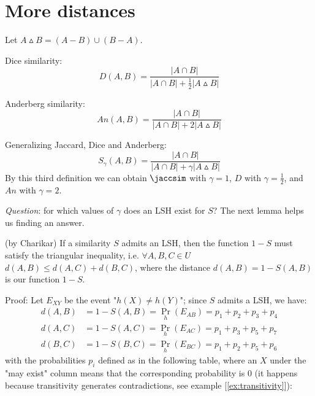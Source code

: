 
\section{More distances}
	Let $A \vartriangle B = (A-B) \cup (B-A)$.

	Dice similarity:
	\begin{equation}
	\displaystyle D(A, B) = \frac{|A\cap B|}{|A\cap B| + \frac{1}{2}|A\vartriangle B|}
	\end{equation}
	
	Anderberg similarity:
	\begin{equation}
	\displaystyle An(A, B) = \frac{|A\cap B|}{|A\cap B| + 2|A\vartriangle B|}
	\end{equation}
	
	Generalizing Jaccard, Dice and Anderberg: 
	\begin{equation}
	\displaystyle S_\gamma(A, B) = \frac{|A\cap B|}{|A\cap B| + \gamma|A\vartriangle B|}
	\end{equation}
	By this third definition we can obtain $\jaccsim$ with $\gamma=1$, $D$ with $\gamma=\frac{1}{2}$, and $An$ with $\gamma=2$.
	
	\textit{Question}: for which values of $\gamma$ does an LSH exist for $S$? The next lemma helps us finding an answer.
	
	\lem (by Charikar) If a similarity $S$ admits an LSH, then the function $1-S$ must satisfy the triangular inequality, i.e. $\forall A,B,C \in U$ \\ $d(A,B) \leq d(A,C) + d(B,C)$, where the distance $d(A,B) = 1-S(A,B)$ is our function $1-S$.
	
	\newpage
	Proof: Let $E_{XY}$ be the event "$h(X) \neq h(Y)$"; since $S$ admits a LSH, we have:
	\begin{align*}
		d(A,B) &= 1-S(A,B) = \Pr_h(E_{AB}) = p_1 + p_2 + p_3 + p_4 \\
		d(A,C) &= 1-S(A,C) = \Pr_h(E_{AC}) = p_1 + p_3 + p_5 + p_7 \\
		d(B,C) &= 1-S(B,C) = \Pr_h(E_{BC}) = p_1 + p_2 + p_5 + p_6
	\end{align*}
	with the probabilities $p_i$ defined as in the following table, where an $X$ under the "may exist" column means that the corresponding probability is $0$ (it happens because transitivity generates contradictions, see example [\ref{ex:transitivity}]):

